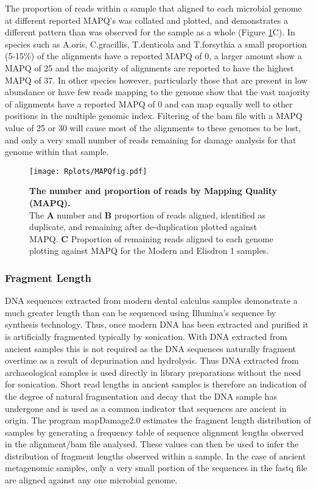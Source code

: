 \documentclass[12pt, a4paper]{article}
\begin{document}
The proportion of reads within a sample that aligned to each microbial genome at different reported MAPQ's was collated and plotted, and demonstrates a different pattern than was observed for the sample as a whole (Figure \ref{fig:MAPQfig}C). In species such as A.oris, C.gracillis, T.denticola and T.forsythia a small proportion (5-15\%) of the alignments have a reported MAPQ of 0, a larger amount show a MAPQ of 25 and the majority of alignments are reported to have the highest MAPQ of 37. In other species however, particularly those that are present in low abundance or have few reads mapping to the genome show that the vast majority of alignments have a reported MAPQ of 0 and can map equally well to other positions in the multiple genomic index. Filtering of the bam file with a MAPQ value of 25 or 30 will cause most of the alignments to these genomes to be lost, and only a very small number of reads remaining for damage analysis for that genome within that sample.

\begin{figure}[h]
	\texttt{[image: Rplots/MAPQfig.pdf]}
	\caption{\textbf{The number and proportion of reads by Mapping Quality (MAPQ).}\\ \small The \textbf{A} number and \textbf{B} proportion of reads aligned, identified as duplicate, and remaining after de-duplication plotted against MAPQ. \textbf{C} Proportion of remaining reads aligned to each genome plotting against MAPQ for the Modern and Elisdron 1 samples.}\label{fig:MAPQfig}
\end{figure}
\clearpage

\subsubsection{Fragment Length}\label{sssec:fragLength}

DNA sequences extracted from modern dental calculus samples demonstrate a much greater length than can be sequenced using Illumina's sequence by synthesis technology. 
Thus, once modern DNA has been extracted and purified it is artificially fragmented typically by sonication. 
With DNA extracted from ancient samples this is not required as the DNA sequences naturally fragment overtime as a result of depurination and hydrolysis. 
Thus DNA extracted from archaeological samples is used directly in library preparations without the need for sonication. Short read lengths in ancient samples is therefore an indication of the degree of natural fragmentation and decay that the DNA sample has undergone and is used as a common indicator that sequences are ancient in origin. 
The program mapDamage2.0 estimates the fragment length distribution of samples by generating a frequency table of sequence alignment lengths observed in the alignment/bam file analysed. 
These values can then be used to infer the distribution of fragment lengths observed within a sample. 
In the case of ancient metagenomic samples, only a very small portion of the sequences in the fastq file are aligned against any one microbial genome.
\end{document}
